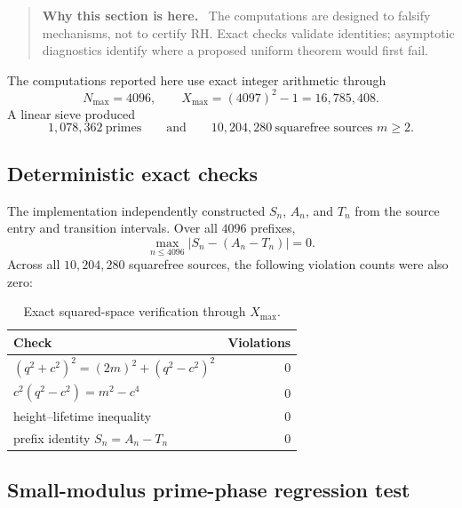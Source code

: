 \documentclass[11pt]{article}
\theoremstyle{definition}
\theoremstyle{remark}
\newcommand{\1}{\mathbf{1}}
\newenvironment{motivation}
  {\begin{quote}\small\color{ovvogray}\textbf{Why this section is here.}\ }
  {\end{quote}}
\begin{document}
\begin{motivation}
The computations are designed to falsify mechanisms, not to certify RH.  Exact checks validate identities; asymptotic diagnostics identify where a proposed uniform theorem would first fail.
\end{motivation}

The computations reported here use exact integer arithmetic through
\begin{equation}
 N_{\max}=4096,
 \qquad
 X_{\max}=(4097)^2-1=16{,}785{,}408.
 \label{eq:numerical-range}
\end{equation}
A linear sieve produced
\begin{equation}
 1{,}078{,}362\ \text{primes}
 \qquad\text{and}\qquad
 10{,}204{,}280\ \text{squarefree sources }m\ge2.
 \label{eq:numerical-counts}
\end{equation}

\subsection{Deterministic exact checks}

The implementation independently constructed $S_n$, $A_n$, and $T_n$
from the source entry and transition intervals.  Over all $4096$
prefixes,
\begin{equation}
 \max_{n\le4096}|S_n-(A_n-T_n)|=0.
 \label{eq:exact-AT-numerical}
\end{equation}
Across all $10{,}204{,}280$ squarefree sources, the following violation
counts were also zero:

\begin{table}[htbp]
\centering
\caption{Exact squared-space verification through $X_{\max}$.}
\label{tab:exact-checks}
\small
\begin{tabular}{lr}
\toprule
Check & Violations\\
\midrule
$(q^2+c^2)^2=(2m)^2+(q^2-c^2)^2$ & 0\\
$c^2(q^2-c^2)=m^2-c^4$ & 0\\
height--lifetime inequality & 0\\
prefix identity $S_n=A_n-T_n$ & 0\\
\bottomrule
\end{tabular}
\end{table}


\subsection{Small-modulus prime-phase regression test}
\label{subsec:numerical-prime-resonance}
\end{document}
